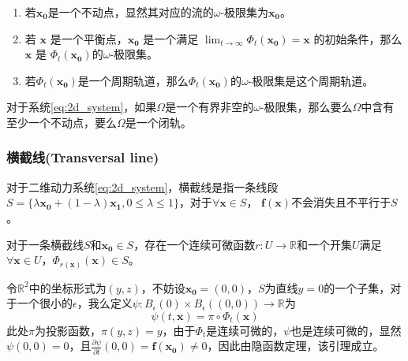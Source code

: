 \begin{exmp}

    \begin{enumerate}
        \item 若$\mathbf{x_0}$是一个不动点，显然其对应的流的$\omega$-极限集为$\mathbf{x_0}$。
        \item 若 $\mathbf{x}$ 是一个平衡点，$\mathbf{x_0}$ 是一个满足 $\lim_{t\to\infty}\Phi_t(\mathbf{x_0}) = \mathbf{x}$ 的初始条件，那么 $\mathbf{x}$ 是 $\Phi_t(\mathbf{x_0})$的$\omega$-极限集。
        \item 若$\Phi_t(\mathbf{x_0})$是一个周期轨道，那么$\Phi_t(\mathbf{x_0})$的$\omega$-极限集是这个周期轨道。
    \end{enumerate}
\end{exmp}
\begin{thm}

    对于系统\ref{eq:2d_system}，如果$\Omega$是一个有界非空的$\omega$-极限集，那么要么$\Omega$中含有至少一个不动点，要么$\Omega$是一个闭轨。
\end{thm}
\subsubsection{横截线(Transversal line)}
\begin{defn}[横截线]
    对于二维动力系统\ref{eq:2d_system}，横截线是指一条线段$S=\{\lambda\mathbf{x_0}+(1-\lambda)\mathbf{x_1},0\leq \lambda\leq 1\}$，对于$\forall \mathbf{x}\in S$， $\mathbf{f}(\mathbf{x})$不会消失且不平行于$S$。
\end{defn}
\begin{lem}\label{lem:transversal}
对于一条横截线$S$和$\mathbf{x_0}\in S$，存在一个连续可微函数$r:U\to\mathbb{R}$和一个开集$U$满足$\forall \mathbf{x}\in U$，$\Phi_{r(\mathbf{x})}(\mathbf{x})\in S$。
\end{lem}
\begin{pf}
    令$\mathbb{R}^2$中的坐标形式为$(y,z)$，不妨设$\mathbf{x_0}=(0,0)$，$S$为直线$y=0$的一个子集，对于一个很小的$\epsilon$，我么定义$\psi:B_{\epsilon}(0)\times B_{\epsilon}((0,0))\to \mathbb{R}$为
    \begin{equation}
        \psi(t,\mathbf{x})=\pi\circ\Phi_t(\mathbf{x})
    \end{equation}
    此处$\pi$为投影函数，$\pi(y,z)=y$，由于$\Phi_t$是连续可微的，$\psi$也是连续可微的，显然$\psi(0,0)=0$，且$\frac{\partial \psi}{\partial t}(0,0)=\mathbf{f}(\mathbf{x_0})\neq 0$，因此由隐函数定理，该引理成立。
\end{pf}
